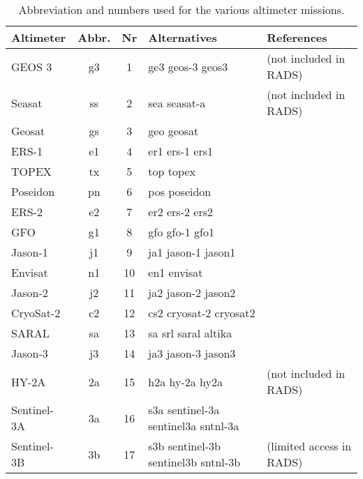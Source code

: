 \begin{table}
\begin{tabular}{lccll}
\hline
Altimeter & Abbr. & Nr & Alternatives & References \\
\hline
GEOS 3      & g3 &  1 & ge3 geos-3 geos3                    & (not included in RADS) \\
Seasat      & ss &  2 & sea seasat-a                        & (not included in RADS) \\
Geosat      & gs &  3 & geo geosat                          & \\
ERS-1       & e1 &  4 & er1 ers-1 ers1                      & \citep{francis1990a,francis1991a} \\
TOPEX       & tx &  5 & top topex                           & \citep{fu1994} \\
Poseidon    & pn &  6 & pos poseidon                        & \\
ERS-2       & e2 &  7 & er2 ers-2 ers2                      & \citep{francis1995a} \\
GFO         & g1 &  8 & gfo gfo-1 gfo1                      & \\
Jason-1     & j1 &  9 & ja1 jason-1 jason1                  & \citep{menard2003} \\
Envisat     & n1 & 10 & en1 envisat                         & \\
Jason-2     & j2 & 11 & ja2 jason-2 jason2                  & \citep{lambin2010} \\
CryoSat-2   & c2 & 12 & cs2 cryosat-2 cryosat2              & \citep{wingham2006} \\
SARAL       & sa & 13 & sa srl saral altika                 & \\
Jason-3     & j3 & 14 & ja3 jason-3 jason3                  & \\
HY-2A       & 2a & 15 & h2a hy-2a hy2a                      & (not included in RADS) \\
Sentinel-3A & 3a & 16 & s3a sentinel-3a sentinel3a sntnl-3a & \\
Sentinel-3B & 3b & 17 & s3b sentinel-3b sentinel3b sntnl-3b & (limited access in RADS) \\
\hline
\end{tabular}
\caption{Abbreviation and numbers used for the various altimeter missions.}
\label{tab:rads4_sats}
\end{table}
